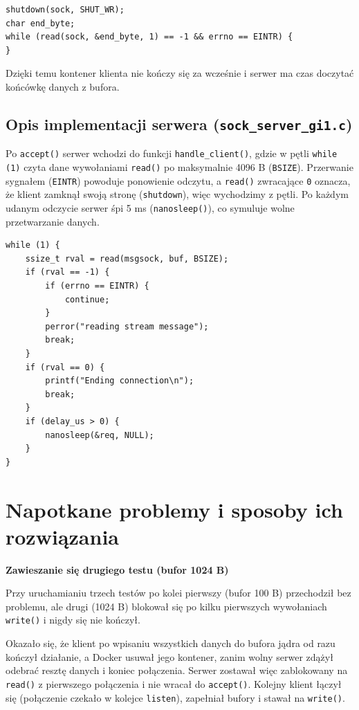 \documentclass[12pt,a4paper]{article}
\begin{document}
\begin{lstlisting}
shutdown(sock, SHUT_WR);
char end_byte;
while (read(sock, &end_byte, 1) == -1 && errno == EINTR) {
}
\end{lstlisting}
Dzięki temu kontener klienta nie kończy się za wcześnie i serwer ma czas doczytać końcówkę danych z bufora.

\subsection*{Opis implementacji serwera (\texttt{sock\_server\_gi1.c})}

Po \texttt{accept()} serwer wchodzi do funkcji \texttt{handle\_client()}, gdzie w pętli \texttt{while (1)} czyta dane wywołaniami \texttt{read()} po maksymalnie 4096 B (\texttt{BSIZE}). Przerwanie sygnałem (\texttt{EINTR}) powoduje ponowienie odczytu, a \texttt{read()} zwracające \texttt{0} oznacza, że klient zamknął swoją stronę (\texttt{shutdown}), więc wychodzimy z pętli. Po każdym udanym odczycie serwer śpi 5 ms (\texttt{nanosleep()}), co symuluje wolne przetwarzanie danych.

\begin{lstlisting}
while (1) {
    ssize_t rval = read(msgsock, buf, BSIZE);
    if (rval == -1) {
        if (errno == EINTR) {
            continue;
        }
        perror("reading stream message");
        break;
    }
    if (rval == 0) {
        printf("Ending connection\n");
        break;
    }
    if (delay_us > 0) {
        nanosleep(&req, NULL);
    }
}
\end{lstlisting}

\section*{Napotkane problemy i sposoby ich rozwiązania}

\textbf{Zawieszanie się drugiego testu (bufor 1024 B)}

Przy uruchamianiu trzech testów po kolei pierwszy (bufor 100 B) przechodził bez problemu, ale drugi (1024 B) blokował się po kilku pierwszych wywołaniach \texttt{write()} i nigdy się nie kończył.

Okazało się, że klient po wpisaniu wszystkich danych do bufora jądra od razu kończył działanie, a Docker usuwał jego kontener, zanim wolny serwer zdążył odebrać resztę danych i koniec połączenia. Serwer zostawał więc zablokowany na \texttt{read()} z pierwszego połączenia i nie wracał do \texttt{accept()}. Kolejny klient łączył się (połączenie czekało w kolejce \texttt{listen}), zapełniał bufory i stawał na \texttt{write()}.
\end{document}
